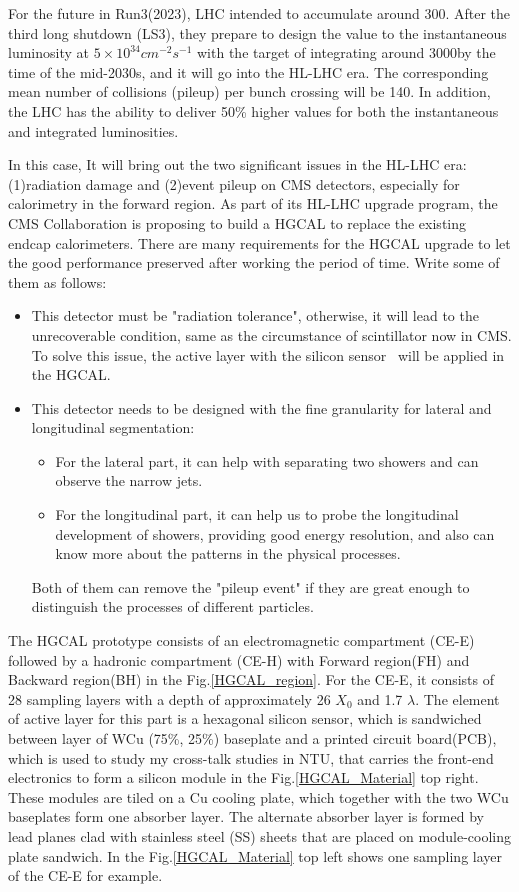 \documentclass[12pt,twoside,a4paper,an,final]{cms-tdr}
\begin{document}
For the future in Run3(2023)\cite{Alves:2017she}, LHC intended to accumulate around 300\fbinv. After the third long shutdown (LS3), they prepare to design the value to the instantaneous luminosity at $5 \times 10^{34} cm^{-2} s^{-1}$ with the target of integrating around 3000\fbinv by the time of the mid-2030s, and it will go into the HL-LHC era. The corresponding mean number of collisions (pileup) per bunch crossing will be 140. In addition, the LHC has the ability to deliver 50\% higher values for both the instantaneous and integrated luminosities.

In this case, It will bring out the two significant issues in the HL-LHC era: (1)radiation damage and (2)event pileup on CMS detectors, especially for calorimetry in the forward region. As part of its HL-LHC upgrade program, the CMS Collaboration is proposing to build a HGCAL to replace the existing endcap calorimeters. There are many requirements for the HGCAL upgrade to let the good performance preserved after working the period of time. Write some of them as follows:
\begin{itemize}
\item  This detector must be "radiation tolerance", otherwise, it will lead to the unrecoverable condition, same as the circumstance of scintillator now in CMS. To solve this issue, the active layer with the silicon sensor~\cite{osti_808409} will be applied in the HGCAL.
\item  This detector needs to be designed with the fine granularity for lateral and longitudinal segmentation:
\begin{itemize}
\item For the lateral part, it can help with separating two showers and can observe the narrow jets. 
\item For the longitudinal part, it can help us to probe the longitudinal development of showers, providing good energy resolution, and also can know more about the patterns in the physical processes.
\end{itemize}
Both of them can remove the "pileup event" if they are great enough to distinguish the processes of different particles.
\end{itemize}

The HGCAL prototype consists of an electromagnetic compartment (CE-E) followed by a hadronic compartment (CE-H) with Forward region(FH) and Backward region(BH) in the Fig.\ref{HGCAL_region}. For the CE-E, it consists of 28 sampling layers with a depth of approximately 26 $X_{0}$ and 1.7 $\lambda$. The element of active layer for this part is a hexagonal silicon sensor, which is sandwiched between layer of WCu (75\%, 25\%) baseplate and a printed circuit board(PCB), which is used to study my cross-talk studies in NTU, that carries the front-end electronics to form a silicon module in the Fig.\ref{HGCAL_Material} top right. These modules are tiled on a Cu cooling plate, which together with the two WCu baseplates form one absorber layer. The alternate absorber layer is formed by lead planes clad with stainless steel (SS) sheets that are placed on module-cooling plate sandwich. In the Fig.\ref{HGCAL_Material} top left shows one sampling layer of the CE-E for example.
\end{document}
